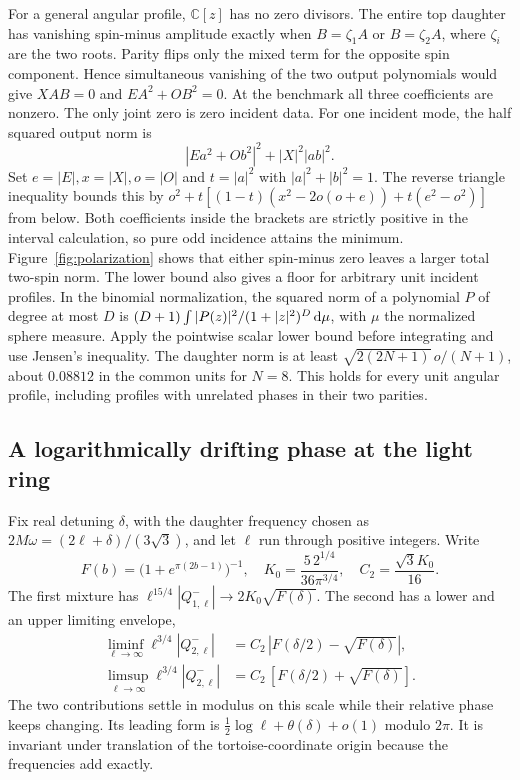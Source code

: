 For a general angular profile, \(\mathbb{C}[z]\) has no zero divisors.
The entire top daughter has vanishing spin-minus amplitude exactly when
\(B=\zeta_1 A\) or \(B=\zeta_2 A\), where \(\zeta_i\) are the two roots.
Parity flips only the mixed term for the opposite spin component.
Hence simultaneous vanishing of the two output polynomials would give
\(XAB=0\) and \(EA^2+OB^2=0\). At the benchmark all three coefficients
are nonzero. The only joint zero is zero incident data.
For one incident mode, the half squared output norm is
\[
 |Ea^2+Ob^2|^2+|X|^2 |ab|^2 .
\]
Set \(e=|E|,x=|X|,o=|O|\) and \(t=|a|^2\) with
\(|a|^2+|b|^2=1\). The reverse triangle inequality bounds this by
\(o^2+t[(1-t)(x^2-2o(o+e))+t(e^2-o^2)]\) from below. Both
coefficients inside the brackets are strictly positive in the interval
calculation, so pure odd incidence attains the minimum. Figure~\ref{fig:polarization}
shows that either spin-minus zero leaves a larger total two-spin norm.
The lower bound also gives a floor for arbitrary unit incident profiles.
In the binomial normalization, the squared norm of a polynomial \(P\)
of degree at most \(D\) is
\((D+1)\int |P(z)|^2/(1+|z|^2)^D\,\mathrm{d}\mu\), with \(\mu\) the
normalized sphere measure. Apply the pointwise scalar lower bound
before integrating and use Jensen's inequality. The daughter norm
is at least \(\sqrt{2(2N+1)}\,o/(N+1)\), about \(0.08812\) in the
common units for \(N=8\). This holds for every unit angular profile,
including profiles with unrelated phases in their two parities.

\subsection{A logarithmically drifting phase at the light ring}

Fix real detuning \(\delta\), with the daughter frequency chosen as
\(2M\omega=(2\ell+\delta)/(3\sqrt3)\), and let \(\ell\) run through
positive integers. Write
\[
 F(b)=\big(1+e^{\pi(2b-1)}\big)^{-1},\quad
 K_0=\frac{5\,2^{1/4}}{36\pi^{3/4}},\quad C_2=\frac{\sqrt3 K_0}{16}.
\]
The first mixture has
\(\ell^{15/4}|Q^-_{1,\ell}|\to 2K_0\sqrt{F(\delta)}\).
The second has a lower and an upper limiting envelope,
\[
 \begin{split}
 \liminf_{\ell\to\infty}\ell^{3/4}|Q^-_{2,\ell}|
   &= C_2\,|F(\delta/2)-\sqrt{F(\delta)}|,\\
 \limsup_{\ell\to\infty}\ell^{3/4}|Q^-_{2,\ell}|
   &= C_2\,[F(\delta/2)+\sqrt{F(\delta)}].
 \end{split}
\]
The two contributions settle in modulus on this scale while their
relative phase keeps changing. Its leading form is
\(\tfrac12\log\ell+\theta(\delta)+o(1)\) modulo \(2\pi\).
It is invariant under translation of the tortoise-coordinate origin
because the frequencies add exactly.

